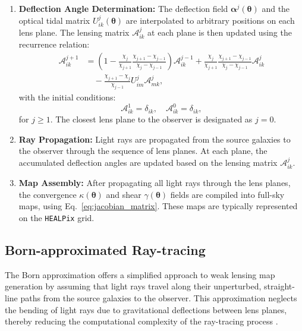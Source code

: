 \begin{enumerate}
    \item \textbf{Deflection Angle Determination:} 
        The deflection field $\boldsymbol{\alpha}^j(\boldsymbol{\theta})$ and the optical tidal matrix $U_{ik}^j(\boldsymbol{\theta})$ are interpolated to arbitrary positions on each lens plane. The lensing matrix $\mathcal{A}^j_{ik}$ at each plane is then updated using the recurrence relation:
        \begin{equation}
            \begin{aligned}
                \mathcal{A}_{i k}^{j+1} & = \left(1 - \frac{\chi_j}{\chi_{j+1}} \frac{\chi_{j+1} - \chi_{j-1}}{\chi_j - \chi_{j-1}} \right) \mathcal{A}_{i k}^{j-1} + \frac{\chi_j}{\chi_{j+1}} \frac{\chi_{j+1} - \chi_{j-1}}{\chi_j - \chi_{j-1}} \mathcal{A}_{i k}^j \\
                & \quad - \frac{\chi_{j+1} - \chi_j}{\chi_{j-1}} U_{i m}^j \mathcal{A}_{m k}^j,
            \end{aligned}
        \end{equation}
        with the initial conditions:
        \begin{equation}
            \mathcal{A}_{i k}^1 = \delta_{i k}, \quad \mathcal{A}_{i k}^0 = \delta_{i k},
        \end{equation}
    for $j \geq 1$. The closest lens plane to the observer is designated as $j = 0$.

    \item \textbf{Ray Propagation:} 
    Light rays are propagated from the source galaxies to the observer through the sequence of lens planes. At each plane, the accumulated deflection angles are updated based on the lensing matrix $\mathcal{A}^j_{ik}$. 

    \item \textbf{Map Assembly:} 
    After propagating all light rays through the lens planes, the convergence $\kappa(\boldsymbol{\theta})$ and shear $\gamma(\boldsymbol{\theta})$ fields are compiled into full-sky maps, using Eq.~\eqref{eq:jacobian_matrix}. These maps are typically represented on the \texttt{HEALPix} grid.
\end{enumerate}

\subsection{Born-approximated Ray-tracing}
The Born approximation offers a simplified approach to weak lensing map generation by assuming that light rays travel along their unperturbed, straight-line paths from the source galaxies to the observer. This approximation neglects the bending of light rays due to gravitational deflections between lens planes, thereby reducing the computational complexity of the ray-tracing process \citep{2006glsw.conf..269S}. 


